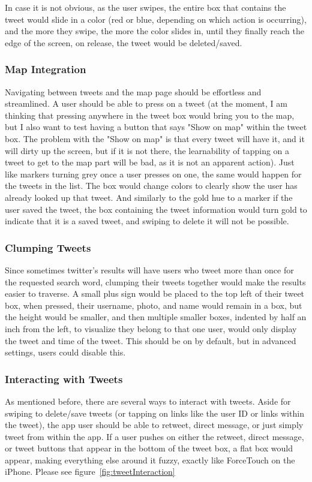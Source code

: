 \documentclass[11pt]{article}
\begin{document}
In case it is not obvious, as the user swipes, the entire box that contains the tweet would slide in a color (red or blue, depending on which action is occurring), and the more they swipe, the more the color slides in, until they finally reach the edge of the screen, on release, the tweet would be deleted/saved.

\subsubsection{Map Integration}
Navigating between tweets and the map page should be effortless and streamlined. A user should be able to press on a tweet (at the moment, I am thinking that pressing anywhere in the tweet box would bring you to the map, but I also want to test having a button that says "Show on map" within the tweet box. The problem with the "Show on map" is that every tweet will have it, and it will dirty up the screen, but if it is not there, the learnability of tapping on a tweet to get to the map part will be bad, as it is not an apparent action). Just like markers turning grey once a user presses on one, the same would happen for the tweets in the list. The box would change colors to clearly show the user has already looked up that tweet. And similarly to the gold hue to a marker if the user saved the tweet, the box containing the tweet information would turn gold to indicate that it is a saved tweet, and swiping to delete it will not be possible.

\subsubsection{Clumping Tweets}
Since sometimes twitter's results will have users who tweet more than once for the requested search word, clumping their tweets together would make the results easier to traverse. A small plus sign would be placed to the top left of their tweet box, when pressed, their username, photo, and name would remain in a box, but the height would be smaller, and then multiple smaller boxes, indented by half an inch from the left, to visualize they belong to that one user, would only display the tweet and time of the tweet. This should be on by default, but in advanced settings, users could disable this.

\subsubsection{Interacting with Tweets}
As mentioned before, there are several ways to interact with tweets. Aside for swiping to delete/save tweets (or tapping on links like the user ID or links within the tweet), the app user should be able to retweet, direct message, or just simply tweet from within the app. If a user pushes on either the retweet, direct message, or tweet buttons that appear in the bottom of the tweet box, a  flat box would appear, making everything else around it fuzzy, exactly like ForceTouch on the iPhone. Please see figure~\ref{fig:tweetInteraction}
\end{document}

